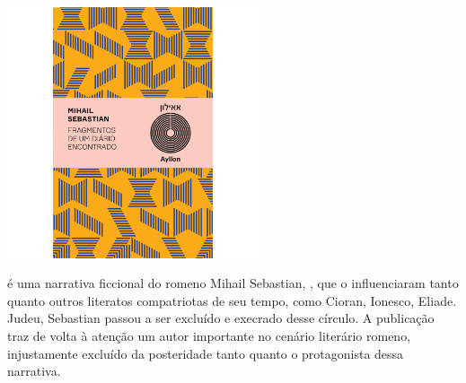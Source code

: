 \vfill

\hspace*{-.4cm}\begin{minipage}[c]{.5\linewidth}
\small{
{}}
\end{minipage}


\pagebreak %

\begin{center}
\hspace*{.5cm}\includegraphics[width=74mm]{./grid/sebastian.jpg}
\end{center}

\hspace*{-7cm}\hrulefill\hspace*{-7cm}

\medskip

 é uma narrativa ficcional do romeno Mihail Sebastian, , que o influenciaram tanto quanto outros literatos compatriotas de seu tempo, como Cioran, Ionesco, Eliade. Judeu, Sebastian passou a ser excluído e execrado desse círculo. A publicação traz de volta à atenção um autor importante no cenário literário romeno, injustamente excluído da posteridade tanto quanto o protagonista dessa narrativa.

